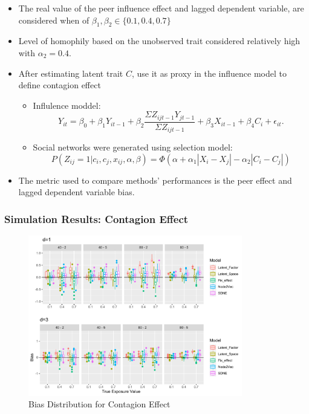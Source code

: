 \documentclass{beamer}
\begin{document}
\begin{frame}
\begin{itemize}
\item{The real value of the peer influence effect and lagged dependent variable, are considered when of $\beta_{1}, \beta_{2} \in \{ 0.1, 0.4, 0.7\}$ }
\vspace{10pt}
\item Level of homophily based on the unobserved trait considered relatively high with $\alpha_{2}=0.4$.
\vspace{10pt}
\item{After estimating latent trait $C$, use it as proxy in the influence model to define contagion effect}
\begin{itemize}
    \item  Influlence moddel: \[  Y_{it}=\beta_{0}+\beta_{1}Y_{i t-1}+\beta_{2} \frac{\Sigma Z_{ij t-1}Y_{j t-1}}{\Sigma Z_{ijt-1}}+ \beta_{3}X_{it-1}+\beta_{4}C_{i}+\epsilon_{it}.\] 

\item{Social networks were generated using  selection model:}
 \[ P(Z_{ij}=1|c_{i},c_{j},x_{ij},\alpha, \beta)= \Phi(\alpha+\alpha_{1}|X_{i}-X_{j}|-\alpha_{2}|C_{i}-C_{j}|)
    \label{eq.4}\]
 
\end{itemize}
   \item The metric used to compare methods’ performances is the peer effect and lagged dependent variable bias. 
\end{itemize}
\end{frame}
\begin{frame}
\frametitle{Simulation Results: Contagion Effect }
\begin{figure}[H]
  \centering
  \includegraphics[width=10 cm, height=7cm ]{plot1.pdf}
  \caption{ Bias Distribution for Contagion Effect}
  \label{Fig:fig1}
\end{figure}
\end{frame}
\end{document}
